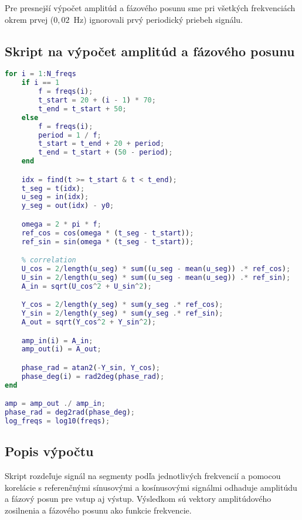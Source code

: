 \documentclass[a4paper, 10pt, ]{article}
\begin{document}
\noindent
Pre presnejší výpočet amplitúd a fázového posunu sme pri všetkých frekvenciách okrem prvej ($0{,}02$~Hz) ignorovali prvý periodický priebeh signálu.

\subsection*{Skript na výpočet amplitúd a fázového posunu}

\begin{lstlisting}[language=Matlab, caption=Výpočet frekvenčnej charakteristiky systému]
% Frequency response calculation
for i = 1:N_freqs
    if i == 1
        f = freqs(i);
        t_start = 20 + (i - 1) * 70;    
        t_end = t_start + 50;
    else
        f = freqs(i);
        period = 1 / f;
        t_start = t_end + 20 + period;  
        t_end = t_start + (50 - period);  
    end

    idx = find(t >= t_start & t < t_end);
    t_seg = t(idx);
    u_seg = in(idx);
    y_seg = out(idx) - y0;

    omega = 2 * pi * f;
    ref_cos = cos(omega * (t_seg - t_start));
    ref_sin = sin(omega * (t_seg - t_start));

    % correlation
    U_cos = 2/length(u_seg) * sum((u_seg - mean(u_seg)) .* ref_cos);
    U_sin = 2/length(u_seg) * sum((u_seg - mean(u_seg)) .* ref_sin);
    A_in = sqrt(U_cos^2 + U_sin^2);

    Y_cos = 2/length(y_seg) * sum(y_seg .* ref_cos);
    Y_sin = 2/length(y_seg) * sum(y_seg .* ref_sin);
    A_out = sqrt(Y_cos^2 + Y_sin^2);

    amp_in(i) = A_in;
    amp_out(i) = A_out;

    phase_rad = atan2(-Y_sin, Y_cos);  
    phase_deg(i) = rad2deg(phase_rad);
end

amp = amp_out ./ amp_in;
phase_rad = deg2rad(phase_deg);
log_freqs = log10(freqs);
\end{lstlisting}

\subsection*{Popis výpočtu}

\noindent
Skript rozdeľuje signál na segmenty podľa jednotlivých frekvencií a pomocou korelácie s referenčnými sínusovými a kosínusovými signálmi odhaduje amplitúdu a fázový posun pre vstup aj výstup. Výsledkom sú vektory amplitúdového zosilnenia a fázového posunu ako funkcie frekvencie.
\end{document}
